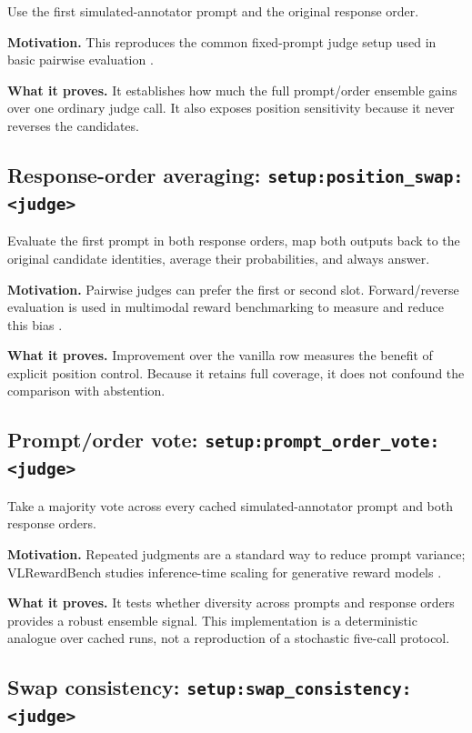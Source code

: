\documentclass[10pt]{article}
\DeclareRobustCommand{\method}[1]{\nolinkurl{#1}}
\begin{document}
Use the first simulated-annotator prompt and the original response order.

\textbf{Motivation.} This reproduces the common fixed-prompt judge setup used in basic
pairwise evaluation \cite{chen2024mllmjudge,yasunaga2025mmrb}.

\textbf{What it proves.} It establishes how much the full prompt/order ensemble gains over
one ordinary judge call. It also exposes position sensitivity because it never reverses
the candidates.

\subsection[Response-order averaging]{Response-order averaging: \method{setup:position_swap:<judge>}}

Evaluate the first prompt in both response orders, map both outputs back to the original
candidate identities, average their probabilities, and always answer.

\textbf{Motivation.} Pairwise judges can prefer the first or second slot. Forward/reverse
evaluation is used in multimodal reward benchmarking to measure and reduce this bias
\cite{hu2025mmrb2}.

\textbf{What it proves.} Improvement over the vanilla row measures the benefit of explicit
position control. Because it retains full coverage, it does not confound the comparison
with abstention.

\subsection[Prompt/order vote]{Prompt/order vote: \method{setup:prompt_order_vote:<judge>}}

Take a majority vote across every cached simulated-annotator prompt and both response
orders.

\textbf{Motivation.} Repeated judgments are a standard way to reduce prompt variance;
VLRewardBench studies inference-time scaling for generative reward models
\cite{li2024vlreward}.

\textbf{What it proves.} It tests whether diversity across prompts and response orders
provides a robust ensemble signal. This implementation is a deterministic analogue over
cached runs, not a reproduction of a stochastic five-call protocol.

\subsection[Swap consistency]{Swap consistency: \method{setup:swap_consistency:<judge>}}
\end{document}
